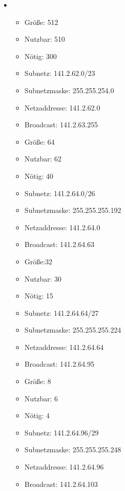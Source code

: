 \documentclass[a4paper]{article}
\begin{document}
\begin{enumerate}[label=(d)]
{\begin{itemize}
        \item {}
        \begin{itemize}
            \item Größe: 512
            \item Nutzbar: 510
            \item Nötig: 300
            \item Subnetz: 141.2.62.0/23
            \item Subnetzmaske: 255.255.254.0
            \item Netzaddresse: 141.2.62.0
            \item Broadcast: 141.2.63.255
        \end{itemize}
        \begin{itemize}
            \item Größe: 64
            \item Nutzbar: 62
            \item Nötig: 40
            \item Subnetz: 141.2.64.0/26
            \item Subnetzmaske: 255.255.255.192
            \item Netzaddresse: 141.2.64.0
            \item Broadcast: 141.2.64.63
        \end{itemize}
        \begin{itemize}
            \item Größe:32
            \item Nutzbar: 30
            \item Nötig: 15
            \item Subnetz: 141.2.64.64/27
            \item Subnetzmaske: 255.255.255.224
            \item Netzaddresse: 141.2.64.64
            \item Broadcast: 141.2.64.95
        \end{itemize}
        \clearpage
        \begin{itemize}
            \item Größe: 8
            \item Nutzbar: 6
            \item Nötig: 4
            \item Subnetz: 141.2.64.96/29
            \item Subnetzmaske: 255.255.255.248
            \item Netzaddresse: 141.2.64.96
            \item Broadcast: 141.2.64.103
        \end{itemize}
    \end{itemize}
    }
\end{enumerate}
\end{document}
